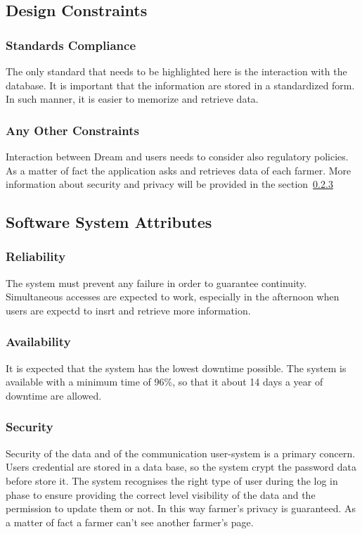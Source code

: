 \subsection{Design Constraints}
\subsubsection{Standards Compliance}
The only standard that needs to be highlighted here is the interaction with the database. It is important that the information are stored 
in a standardized form. In such manner, it is easier to memorize and retrieve data.


\subsubsection{Any Other Constraints}
Interaction between Dream and users needs to consider also regulatory policies.
As a matter of fact the application asks and retrieves data of each farmer.
More information about security and privacy will be provided in the section~\ref{subsubsection:3.4.3}


\subsection{Software System Attributes}

\subsubsection{Reliability}
The system must prevent any failure in order to guarantee continuity. 
Simultaneous accesses are expected to work, especially in the afternoon when users are expectd to insrt and retrieve more information.

\subsubsection{Availability}
It is expected that the system has the lowest downtime possible. 
The system is available with a minimum time of 96\%, 
so that it about 14 days a year of downtime are allowed.


\subsubsection{Security}
\label{subsubsection:3.4.3}
Security of the data and of the communication user-system is a primary concern. Users credential are stored in a data base, so the system crypt the password data before store it. The system recognises the right type of user during the log in phase to ensure providing the correct level visibility of the data and the permission to update them or not. In this way farmer’s privacy is guaranteed. As a matter of fact a farmer can’t see another farmer’s page.



